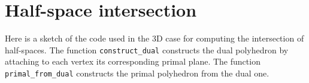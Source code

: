\chapter{Half-space intersection}
\label{appendix:code-intersection}

Here is a sketch of the code used in the 3D case for computing the intersection
of half-spaces. The function \texttt{construct\_dual} constructs the dual
polyhedron by attaching to each vertex its corresponding primal plane. The
function \texttt{primal\_from\_dual} constructs the primal polyhedron from the
dual one.



